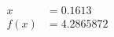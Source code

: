 \documentclass[preview]{standalone}
\begin{document}
\begin{align*}
x &= 0.1613\\f(x) &= 4.2865872
\end{align*}
\end{document}
